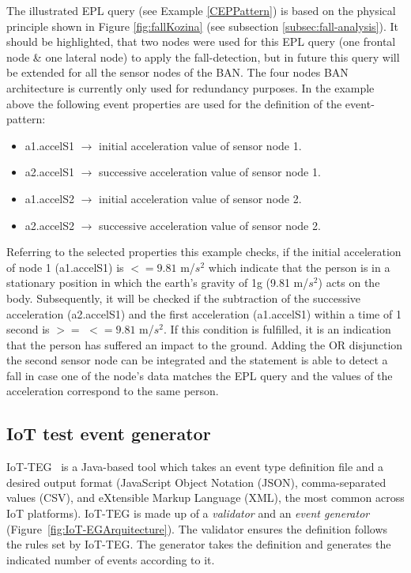 \documentclass[review]{elsarticle}
\begin{document}
The illustrated EPL query (see Example \ref{CEPPattern}) is based on the physical principle shown in Figure \ref{fig:fallKozina} (see subsection \ref{subsec:fall-analysis}). It should be highlighted, that two nodes were used for this EPL query (one frontal node \& one lateral node) to apply the fall-detection, but in future this query will be extended for all the sensor nodes of the BAN. The four nodes BAN architecture is currently only used for redundancy purposes. In the example above the following event properties are used for the definition of the event-pattern:
\begin{itemize}
	\item a1.accelS1 $\rightarrow$ initial acceleration value of sensor node 1.
	\item a2.accelS1 $\rightarrow$ successive acceleration value of sensor node 1.
	\item a1.accelS2 $\rightarrow$ initial acceleration value of sensor node 2.
	\item a2.accelS2 $\rightarrow$ successive acceleration value of sensor node 2.
\end{itemize}
Referring to the selected properties this example checks, if the initial acceleration of node 1 (a1.accelS1) is $<= 9.81$ m/$s^2$ which indicate that the person is in a stationary position in which the earth's gravity of 1g (9.81 m/$s^2$) acts on the body. Subsequently, it will be checked if the subtraction of the successive acceleration (a2.accelS1) and the first acceleration (a1.accelS1)  within a time of 1 second is $>=$ $<= 9.81$ m/$s^2$. If this condition is fulfilled, it is an indication that the person has suffered an impact to the ground. Adding the OR disjunction the second sensor node can be integrated and the statement is able to detect a fall in case one of the node's data matches the EPL query and the values of the acceleration correspond to the same person.
\subsection{IoT test event generator}
\label{iotteg}

IoT-TEG~\cite{Gutierrez2017,TesisGutierrez2017} is a Java-based tool which takes an event 
type definition file and a desired output format (JavaScript Object Notation (JSON), comma-separated values (CSV), and eXtensible Markup Language (XML), the most common across 
IoT platforms). IoT-TEG is made up of a \emph{validator} and an \emph{event generator} 
(Figure~\ref{fig:IoT-EGArquitecture}). The validator ensures the definition follows the rules set 
by IoT-TEG. The generator takes the definition and generates the indicated number of events according to it.
\end{document}
